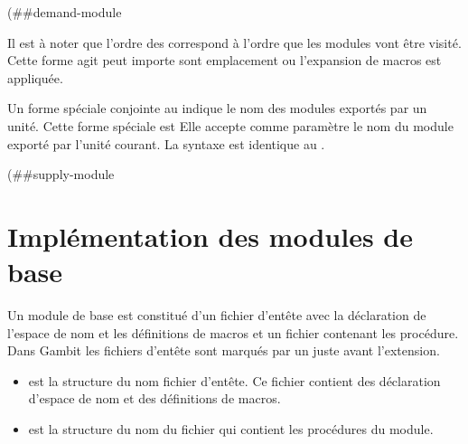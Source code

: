 \begin{center}
  \begin{mplisting}{0.8}
(##demand-module %
\end{mplisting}
\end{center}

Il est à noter que l'ordre des  correspond à l'ordre
que les modules vont être visité. Cette forme agit peut importe sont emplacement
ou l'expansion de macros est appliquée.



Un forme spéciale conjointe au  indique le nom
des modules exportés par un unité. Cette forme spéciale est 
Elle accepte comme paramètre le nom du module exporté par l'unité courant.
La syntaxe est identique au .

\begin{center}
  \begin{mplisting}{0.8}
(##supply-module %
\end{mplisting}
\end{center}

\section{Implémentation des modules de base}

Un module de base est constitué d'un fichier d'entête avec la déclaration
de l'espace de nom et les définitions de macros et un fichier contenant
les procédure. Dans Gambit les fichiers d'entête sont marqués par un \lstcode{#}
juste avant l'extension.

\begin{itemize}

  \item {} est la structure du nom fichier d'entête.
    Ce fichier contient des déclaration d'espace de nom et des
    définitions de macros.

  \item {} est la structure du nom du fichier qui contient
    les procédures du module.

\end{itemize}

